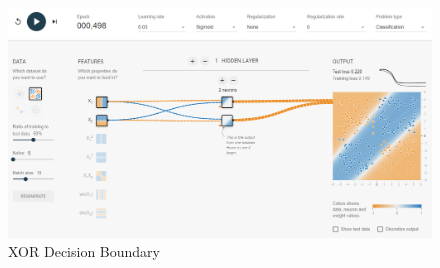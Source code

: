\documentclass[12pt]{article}
\begin{document}
\begin{figure}[!ht]
    \centering
    \includegraphics{Images/Question 9 Decision Boundary.png}
    \caption{XOR Decision Boundary}
\end{figure}
\end{document}
